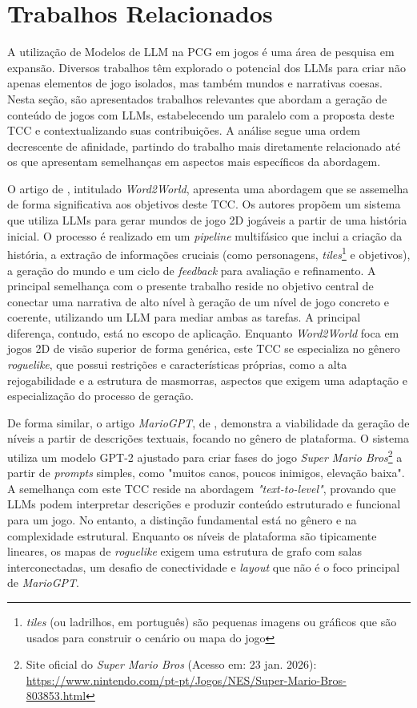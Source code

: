 \chapter{Trabalhos Relacionados}
\label{cap:trabalhos-relacionados}

A utilização de Modelos de \gls{LLM} na \gls{PCG} em jogos é uma área de
pesquisa em expansão. Diversos trabalhos têm explorado o potencial dos \gls{LLM}s
para criar não apenas elementos de jogo isolados, mas também mundos e narrativas
coesas. Nesta seção, são apresentados trabalhos relevantes que abordam a geração
de conteúdo de jogos com \gls{LLM}s, estabelecendo um paralelo com a proposta deste
TCC e contextualizando suas contribuições. A análise segue uma ordem decrescente
de afinidade, partindo do trabalho mais diretamente relacionado até os que
apresentam semelhanças em aspectos mais específicos da abordagem.

O artigo de , intitulado \textit{Word2World},
apresenta uma abordagem que se assemelha de forma significativa aos objetivos
deste TCC. Os autores propõem um sistema que utiliza \gls{LLM}s para gerar
mundos de jogo 2D jogáveis a partir de uma história inicial. O processo é
realizado em um \textit{pipeline} multifásico que inclui a criação da história,
a extração de informações cruciais (como personagens,
\textit{tiles}\footnote{\textit{tiles} (ou ladrilhos, em português) são pequenas imagens
    ou gráficos que são usados para construir o cenário ou mapa do jogo} e
objetivos), a geração do mundo e um ciclo de \textit{feedback} para avaliação e
refinamento. A principal semelhança com o presente trabalho reside no objetivo
central de conectar uma narrativa de alto nível à geração de um nível de jogo
concreto e coerente, utilizando um \gls{LLM} para mediar ambas as tarefas. A
principal diferença, contudo, está no escopo de aplicação. Enquanto
\textit{Word2World} foca em jogos 2D de visão superior de forma genérica, este
TCC se especializa no gênero \textit{roguelike}, que possui restrições e
características próprias, como a alta rejogabilidade e a estrutura de masmorras,
aspectos que exigem uma adaptação e especialização do processo de geração.

De forma similar, o artigo \textit{MarioGPT}, de
, demonstra a viabilidade da geração de níveis
a partir de descrições textuais, focando no gênero de plataforma. O sistema
utiliza um modelo \gls{GPT}-2 ajustado para criar fases do jogo \textit{Super Mario
Bros}\footnote{Site oficial do \textit{Super Mario
Bros} (Acesso em: 23 jan. 2026): \url{https://www.nintendo.com/pt-pt/Jogos/NES/Super-Mario-Bros-803853.html}}
a partir de \textit{prompts} simples, como "muitos canos, poucos inimigos,
elevação baixa". A semelhança com este TCC reside na abordagem
\textit{"text-to-level"}, provando que \gls{LLM}s podem interpretar descrições e
produzir conteúdo estruturado e funcional para um jogo. No entanto, a distinção
fundamental está no gênero e na complexidade estrutural. Enquanto os níveis de
plataforma são tipicamente lineares, os mapas de \textit{roguelike} exigem uma
estrutura de grafo com salas interconectadas, um desafio de conectividade e
\textit{layout} que não é o foco principal de \textit{MarioGPT}.

